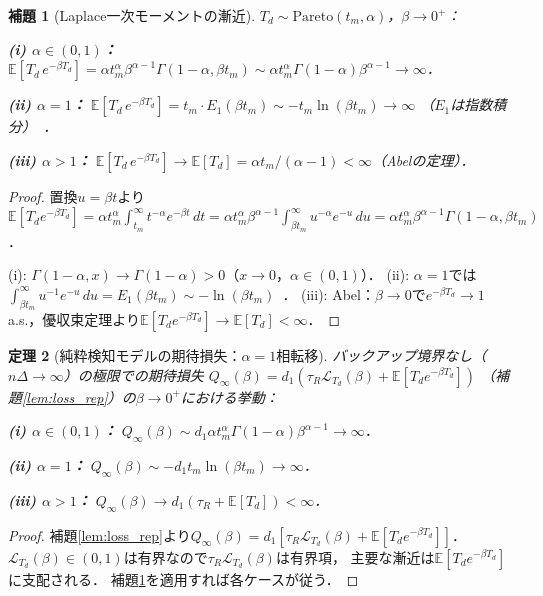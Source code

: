 \documentclass[12pt,a4paper]{article}
\theoremstyle{plain}
\newtheorem{theorem}{定理}[section]
\newtheorem{lemma}[theorem]{補題}
\theoremstyle{definition}
\theoremstyle{remark}
\newcommand{\E}{\mathbb{E}}
\newcommand{\calL}{\mathcal{L}}
\newcommand{\Qinf}{Q_{\infty}}
\begin{document}
\begin{lemma}[Laplace一次モーメントの漸近]\label{lem:laplace_moment}
$T_d\sim\mathrm{Pareto}(t_m,\alpha)$，$\beta\to0^+$：

\noindent\textbf{(i) $\alpha\in(0,1)$：}
$\E[T_d\,e^{-\beta T_d}]=\alpha t_m^\alpha\beta^{\alpha-1}\Gamma(1-\alpha,\beta t_m)
\sim\alpha t_m^\alpha\Gamma(1-\alpha)\beta^{\alpha-1}\to\infty$．

\noindent\textbf{(ii) $\alpha=1$：}
$\E[T_d\,e^{-\beta T_d}]=t_m\cdot E_1(\beta t_m)\sim -t_m\ln(\beta t_m)\to\infty$
（$E_1$は指数積分）~\cite{abramowitz1965}．

\noindent\textbf{(iii) $\alpha>1$：}
$\E[T_d\,e^{-\beta T_d}]\to\E[T_d]=\alpha t_m/(\alpha-1)<\infty$（Abelの定理）．
\end{lemma}

\begin{proof}
置換$u=\beta t$より
$\E[T_d e^{-\beta T_d}]=\alpha t_m^\alpha\int_{t_m}^\infty t^{-\alpha}e^{-\beta t}\,dt
=\alpha t_m^\alpha\beta^{\alpha-1}\int_{\beta t_m}^\infty u^{-\alpha}e^{-u}\,du
=\alpha t_m^\alpha\beta^{\alpha-1}\Gamma(1-\alpha,\beta t_m)$．

(i): $\Gamma(1-\alpha,x)\to\Gamma(1-\alpha)>0$（$x\to0$，$\alpha\in(0,1)$）．
(ii): $\alpha=1$では$\int_{\beta t_m}^\infty u^{-1}e^{-u}\,du=E_1(\beta t_m)\sim -\ln(\beta t_m)$~\cite{abramowitz1965}．
(iii): Abel：$\beta\to0$で$e^{-\beta T_d}\to1$ a.s.，優収束定理より$\E[T_d e^{-\beta T_d}]\to\E[T_d]<\infty$．
\end{proof}

\begin{theorem}[純粋検知モデルの期待損失：$\alpha=1$相転移]\label{thm:q_inf}
バックアップ境界なし（$n\Delta\to\infty$）の極限での期待損失
$\Qinf(\beta)=d_1(\tau_R\calL_{T_d}(\beta)+\E[T_d e^{-\beta T_d}])$
（補題\ref{lem:loss_rep}）の$\beta\to0^+$における挙動：

\noindent\textbf{(i) $\alpha\in(0,1)$：} $\Qinf(\beta)\sim d_1\alpha t_m^\alpha\Gamma(1-\alpha)\beta^{\alpha-1}\to\infty$．

\noindent\textbf{(ii) $\alpha=1$：} $\Qinf(\beta)\sim -d_1 t_m\ln(\beta t_m)\to\infty$．

\noindent\textbf{(iii) $\alpha>1$：} $\Qinf(\beta)\to d_1(\tau_R+\E[T_d])<\infty$．
\end{theorem}

\begin{proof}
補題\ref{lem:loss_rep}より$\Qinf(\beta)=d_1[\tau_R\calL_{T_d}(\beta)+\E[T_d e^{-\beta T_d}]]$．
$\calL_{T_d}(\beta)\in(0,1)$は有界なので$\tau_R\calL_{T_d}(\beta)$は有界項，
主要な漸近は$\E[T_d e^{-\beta T_d}]$に支配される．
補題\ref{lem:laplace_moment}を適用すれば各ケースが従う．
\end{proof}
\end{document}
